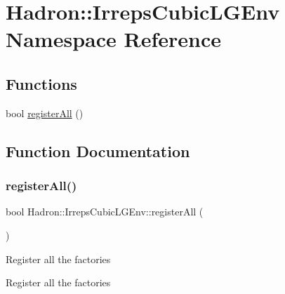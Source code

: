 \hypertarget{namespaceHadron_1_1IrrepsCubicLGEnv}{}\section{Hadron\+:\+:Irreps\+Cubic\+L\+G\+Env Namespace Reference}
\label{namespaceHadron_1_1IrrepsCubicLGEnv}
\subsection*{Functions}
\begin{DoxyCompactItemize}
\item 
bool \mbox{\hyperlink{namespaceHadron_1_1IrrepsCubicLGEnv_a4c9a3cd2351dacf5ec8f2f58df4b7e3a}{register\+All}} ()
\end{DoxyCompactItemize}


\subsection{Function Documentation}
\mbox{\label{namespaceHadron_1_1IrrepsCubicLGEnv_a4c9a3cd2351dacf5ec8f2f58df4b7e3a}} 
\subsubsection{\texorpdfstring{registerAll()}{registerAll()}}
{\footnotesize\ttfamily bool Hadron\+::\+Irreps\+Cubic\+L\+G\+Env\+::register\+All (\begin{DoxyParamCaption}{ }\end{DoxyParamCaption})}

Register all the factories

Register all the factories

